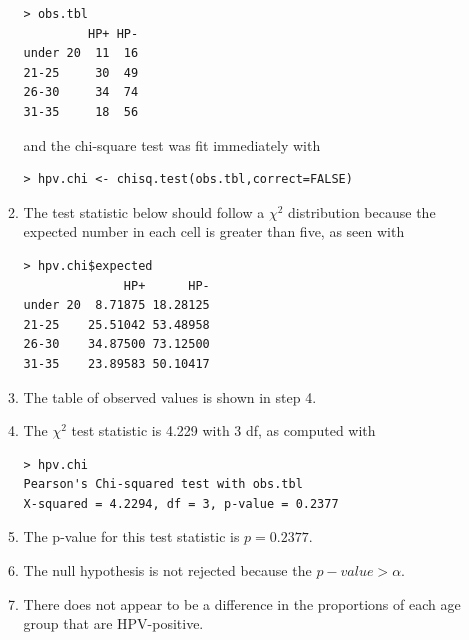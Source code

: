 \documentclass[10pt,openany]{book}\usepackage[]{graphicx}\usepackage[]{color}
\makeatletter
\newenvironment{kframe}{%
 \def\at@end@of@kframe{}%
 \ifinner\ifhmode%
  \def\at@end@of@kframe{\end{minipage}}%
  \begin{minipage}{\columnwidth}%
 \fi\fi%
 \def\FrameCommand##1{\hskip\@totalleftmargin \hskip-\fboxsep
 \colorbox{shadecolor}{##1}\hskip-\fboxsep
     \hskip-\linewidth \hskip-\@totalleftmargin \hskip\columnwidth}%
 \MakeFramed {\advance\hsize-\width
   \@totalleftmargin\z@ \linewidth\hsize
   \@setminipage}}%
 {\par\unskip\endMakeFramed%
 \at@end@of@kframe}
\newenvironment{knitrout}{}{} %
\makeatother
\begin{document}
\begin{itemize}
\begin{enumerate}
\begin{knitrout}
\begin{kframe}
\begin{verbatim}
> obs.tbl
         HP+ HP-
under 20  11  16
21-25     30  49
26-30     34  74
31-35     18  56
\end{verbatim}
\end{kframe}
\end{knitrout}
and the chi-square test was fit immediately with
\begin{knitrout}
\color{fgcolor}\begin{kframe}
\begin{verbatim}
> hpv.chi <- chisq.test(obs.tbl,correct=FALSE)
\end{verbatim}
\end{kframe}
\end{knitrout}
      \item The test statistic below should follow a $\chi^{2}$ distribution because the expected number in each cell is greater than five, as seen with
\begin{knitrout}
\color{fgcolor}\begin{kframe}
\begin{verbatim}
> hpv.chi$expected
              HP+      HP-
under 20  8.71875 18.28125
21-25    25.51042 53.48958
26-30    34.87500 73.12500
31-35    23.89583 50.10417
\end{verbatim}
\end{kframe}
\end{knitrout}
      \item The table of observed values is shown in step 4.
      \item The $\chi^{2}$ test statistic is 4.229 with 3 df, as computed with
\begin{knitrout}
\color{fgcolor}\begin{kframe}
\begin{verbatim}
> hpv.chi
Pearson's Chi-squared test with obs.tbl 
X-squared = 4.2294, df = 3, p-value = 0.2377
\end{verbatim}
\end{kframe}
\end{knitrout}
      \item The p-value for this test statistic is $p=0.2377$.
      \item The null hypothesis is not rejected because the $p-value>\alpha$.
      \item There does not appear to be a difference in the proportions of each age group that are HPV-positive.
    \end{enumerate}

\end{itemize}
\end{document}

